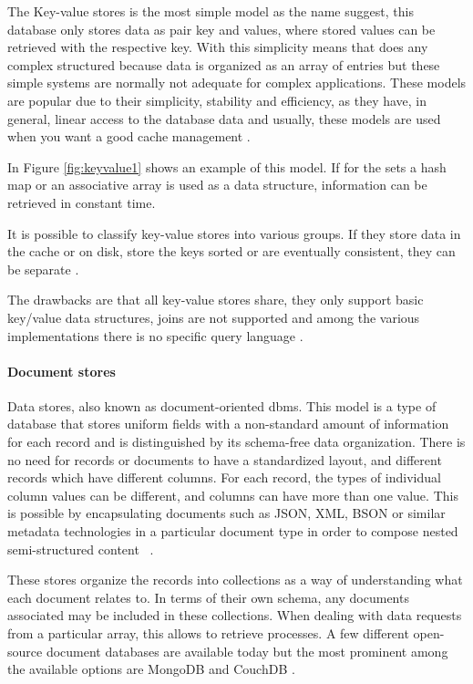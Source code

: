 The Key-value stores is the most simple model as the name suggest, this database only stores data as pair key and values, where stored values can be retrieved with the respective key. With this simplicity means that does any complex structured because data is organized as an array of entries but these simple systems are normally not adequate for complex applications.
These models are popular due to their simplicity, stability and efficiency, as they have, in general, linear access to the database data and usually, these models are used when you want a good cache management \cite{wuoverview,Startednosql,tiwari_2011,nosqlchoose,sabrina1448}. 

In Figure \ref{fig:keyvalue1} shows an example of this model. If for the sets a hash map or an associative array is used as a data structure, information can be retrieved in constant time.



It is possible to classify key-value stores into various groups. If they store data in the cache or on disk, store the keys sorted or are eventually consistent, they can be separate \cite{sabrina1448}.
 
The drawbacks are that all key-value stores share, they only support basic key/value data structures, joins are not supported and among the various implementations there is no specific query language \cite{sabrina1448}.

\paragraph{Document stores}

Data stores, also known as document-oriented \gls{dbms}. This model is a type of database that stores uniform fields with a non-standard amount of information for each record and is distinguished by its schema-free data organization. There is no need for records or documents to have a standardized layout, and different records which have different columns. For each record, the types of individual column values can be different, and columns can have more than one value. This is possible by encapsulating documents such as JSON, XML, BSON or similar metadata technologies in a particular document type in order to compose nested semi-structured content ~\cite{nosqlchoose,sabrina1448,tiwari_2011,wuoverview,vera2015data}.

These stores organize the records into collections as a way of understanding what each document relates to. In terms of their own schema, any documents associated may be included in these collections. When dealing with data requests from a particular array, this allows to retrieve processes. A few different open-source document databases are available today but the most prominent among the available options are MongoDB and CouchDB \cite{nosqlchoose,tiwari_2011}.

